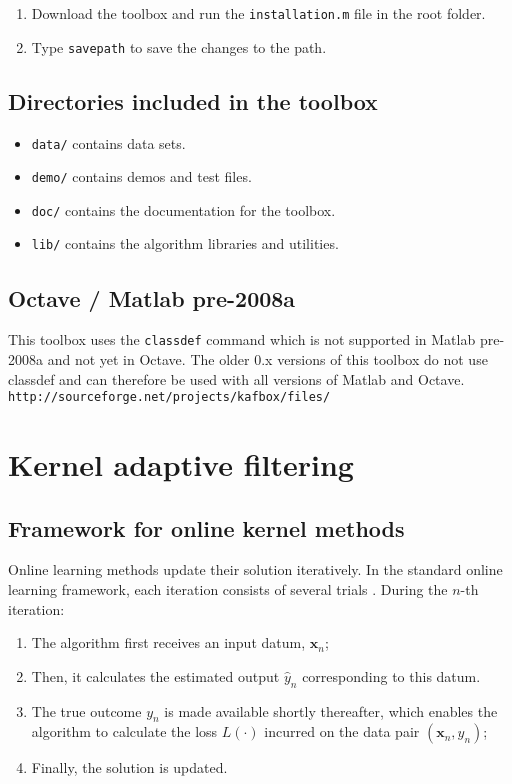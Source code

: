 \documentclass[]{report}
\def\x{{\mathbf x}}
\begin{document}
\begin{enumerate}
\item Download the toolbox and run the \verb"installation.m" file in the root folder.
\item Type \verb"savepath" to save the changes to the path.
\end{enumerate}

\section{Directories included in the toolbox}

\begin{itemize}
\item \verb"data/" contains data sets.
\item \verb"demo/" contains demos and test files.
\item \verb"doc/" contains the documentation for the toolbox.
\item \verb"lib/" contains the algorithm libraries and utilities.
\end{itemize}

\section{Octave / Matlab pre-2008a}

This toolbox uses the \verb"classdef" command which is not supported in Matlab pre-2008a and not yet in Octave. The older 0.x versions of this toolbox do not use classdef and can therefore be used with all versions of Matlab and Octave. \verb"http://sourceforge.net/projects/kafbox/files/"


\chapter{Kernel adaptive filtering}

\section{Framework for online kernel methods}

Online learning methods update their solution iteratively. In the standard online learning framework, each iteration consists of several trials \cite{wiki:online_machine_learning}. During the $n$-th iteration:
\begin{enumerate}
\item The algorithm first receives an input datum, $\x_n$;
\item Then, it calculates the estimated output $\hat y_n$ corresponding to this datum.
\item The true outcome $y_n$ is made available shortly thereafter, which enables the algorithm to calculate the loss $L(\cdot)$ incurred on the data pair $(\x_n,y_n)$;
\item Finally, the solution is updated.
\end{enumerate}
\end{document}
